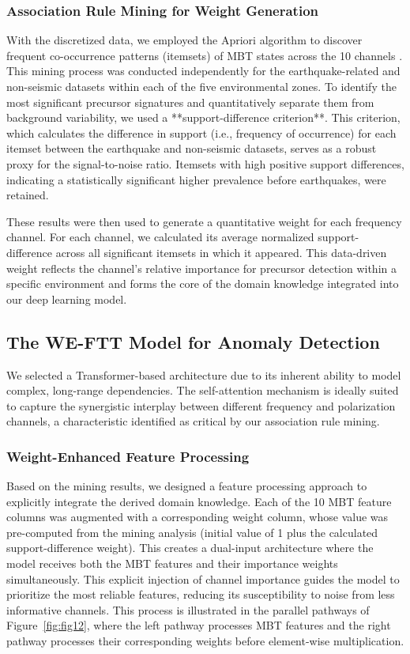 \documentclass[preprint,review,12pt,authoryear]{elsarticle}
\begin{document}
\subsubsection{Association Rule Mining for Weight Generation}\label{sec:apriori}
With the discretized data, we employed the Apriori algorithm to discover frequent co-occurrence patterns (itemsets) of MBT states across the 10 channels \citep{agrawalMiningAssociationRules1993a,hanMiningFrequentPatterns2000a}. This mining process was conducted independently for the earthquake-related and non-seismic datasets within each of the five environmental zones. To identify the most significant precursor signatures and quantitatively separate them from background variability, we used a **support-difference criterion**. This criterion, which calculates the difference in support (i.e., frequency of occurrence) for each itemset between the earthquake and non-seismic datasets, serves as a robust proxy for the signal-to-noise ratio. Itemsets with high positive support differences, indicating a statistically significant higher prevalence before earthquakes, were retained.

These results were then used to generate a quantitative weight for each frequency channel. For each channel, we calculated its average normalized support-difference across all significant itemsets in which it appeared. This data-driven weight reflects the channel's relative importance for precursor detection within a specific environment and forms the core of the domain knowledge integrated into our deep learning model.

\subsection{The WE-FTT Model for Anomaly Detection}\label{sec:weftt_model}
We selected a Transformer-based architecture due to its inherent ability to model complex, long-range dependencies. The self-attention mechanism is ideally suited to capture the synergistic interplay between different frequency and polarization channels, a characteristic identified as critical by our association rule mining.

\subsubsection{Weight-Enhanced Feature Processing}\label{sec:weight_processing}
Based on the mining results, we designed a feature processing approach to explicitly integrate the derived domain knowledge. Each of the 10 MBT feature columns was augmented with a corresponding weight column, whose value was pre-computed from the mining analysis (initial value of 1 plus the calculated support-difference weight). This creates a dual-input architecture where the model receives both the MBT features and their importance weights simultaneously. This explicit injection of channel importance guides the model to prioritize the most reliable features, reducing its susceptibility to noise from less informative channels. This process is illustrated in the parallel pathways of Figure~\ref{fig:fig12}, where the left pathway processes MBT features and the right pathway processes their corresponding weights before element-wise multiplication.
\end{document}
